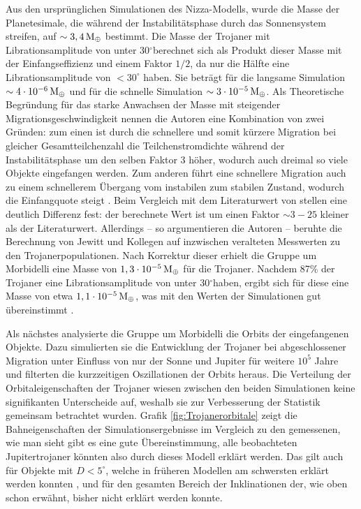 \documentclass[12pt,a4paper,twoside,open=right,bibliography=totoc]{scrbook}
\renewcommand{\cite}{ \citep}
\newcommand{\degree}{$^\circ$}
\newcommand{\ME}{M_\oplus}
\begin{document}
Aus den ursprünglichen Simulationen des Nizza-Modells,
wurde die Masse der Planetesimale, die während der Instabilitätsphase durch das Sonnensystem streifen, auf $\sim \unit[3,4]{\ME}$ bestimmt.
Die Masse der Trojaner mit Librationsamplitude von unter 30\degree berechnet sich als Produkt dieser Masse mit der Einfangseffizienz und einem Faktor $1/2$, da nur die Hälfte eine Librationsamplitude von $<30^\circ$ haben. Sie beträgt für die langsame Simulation $\sim\unit[4\cdot 10^{-6}]{\ME}$ und für die schnelle Simulation $\sim \unit[3\cdot 10^{-5}]{\ME}$.
Als Theoretische Begründung für das starke Anwachsen der Masse mit steigender Migrationsgeschwindigkeit nennen die Autoren eine Kombination von zwei Gründen:
zum einen ist durch die schnellere und somit kürzere Migration bei gleicher Gesamt\/teilchenzahl die Teilchenstromdichte während der Instabilitätsphase um den selben Faktor 3 höher, wodurch auch dreimal so viele Objekte eingefangen werden. Zum anderen führt eine schnellere Migration auch zu einem schnellerem Übergang vom instabilen zum stabilen Zustand, wodurch die Einfangquote steigt\cite{Morbidelli2005}.
Beim Vergleich mit dem Literaturwert von \cite{Jewitt2000} stellen \cite{Morbidelli2005} eine deutlich Differenz fest: der berechnete Wert ist um einen Faktor $\sim 3-25$ kleiner als der Literaturwert.
Allerdings – so argumentieren die Autoren – beruhte die Berechnung von Jewitt und Kollegen auf inzwischen veralteten Messwerten zu den Trojanerpopulationen.
Nach Korrektur dieser erhielt die Gruppe um Morbidelli eine Masse von $\unit[1,3 \cdot 10^{-5}]{\ME}$ für die Trojaner. Nachdem 87\% der Trojaner eine Librationsamplitude von unter 30\degree haben, ergibt sich für diese eine Masse von etwa $\unit[1,1 \cdot 10^{-5}]{\ME}$, was mit den Werten der Simulationen gut übereinstimmt\cite{Morbidelli2005}.

Als nächstes analysierte die Gruppe um Morbidelli die Orbits der eingefangenen Objekte. Dazu simulierten sie die Entwicklung der Trojaner bei abgeschlossener Migration unter Einfluss von nur der Sonne und Jupiter für weitere $10^5$ Jahre und filterten die kurzzeitigen Oszillationen der Orbits heraus.
Die Verteilung der Orbitaleigenschaften der Trojaner wiesen zwischen den beiden Simulationen keine signifikanten Unterscheide auf, weshalb sie zur Verbesserung der Statistik gemeinsam betrachtet wurden.
Grafik \ref{fig:Trojanerorbitale} zeigt die Bahneigenschaften der Simulationsergebnisse im Vergleich zu den gemessenen, wie man sieht gibt es eine gute Übereinstimmung, alle beobachteten Jupitertrojaner könnten also durch dieses Modell erklärt werden.
Das gilt auch für Objekte mit $D<5^\circ$, welche in früheren Modellen am schwersten erklärt werden konnten\cite{Marzari2002,Morbidelli2005},
und für den gesamten Bereich der Inklinationen der, wie oben schon erwähnt, bisher nicht erklärt werden konnte.
\end{document}

